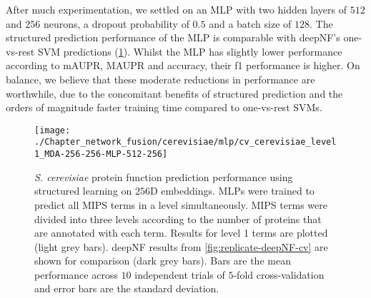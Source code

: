 
After much experimentation, we settled on an MLP with two hidden layers of $512$ and $256$ neurons, a dropout probability of $0.5$ and a batch size of $128$.
The structured prediction performance of the MLP is comparable with deepNF's one-vs-rest SVM predictions (\ref{fig:levels-cerevisiae-cv}).
Whilst the MLP has slightly lower performance according to mAUPR, MAUPR and accuracy, their f1 performance is higher.
On balance, we believe that these moderate reductions in performance are worthwhile, due to the concomitant benefits of structured prediction and the orders of magnitude faster training time compared to one-vs-rest SVMs.

\begin{figure}[!hbt]
    \centering
    \texttt{[image: ./Chapter\_network\_fusion/cerevisiae/mlp/cv\_cerevisiae\_level1\_MDA-256-256-MLP-512-256]}
    \caption{%
        \emph{S. cerevisiae} protein function prediction performance using structured learning on $256$D embeddings.
        MLPs were trained to predict all MIPS terms in a level simultaneously.
        MIPS terms were divided into three levels according to the number of proteins that are annotated with each term.
        Results for level 1 terms are plotted (light grey bars).
        deepNF results from \ref{fig:replicate-deepNF-cv} are shown for comparison (dark grey bars).
        Bars are the mean performance across $10$ independent trials of $5$-fold cross-validation and error bars are the standard deviation.
    }
    \label{fig:levels-cerevisiae-cv}
\end{figure}

